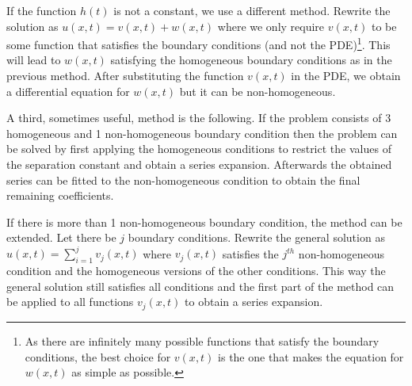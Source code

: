 
    \begin{method}
        If the function $h(t)$ is not a constant, we use a different method. Rewrite the solution as $u(x, t) = v(x, t) + w(x, t)$ where we only require $v(x, t)$ to be some function that satisfies the boundary conditions (and not the PDE)\footnote{As there are infinitely many possible functions that satisfy the boundary conditions, the best choice for $v(x, t)$ is the one that makes the equation for $w(x, t)$ as simple as possible.}. This will lead to $w(x, t)$ satisfying the homogeneous boundary conditions as in the previous method. After substituting the function $v(x, t)$ in the PDE, we obtain a differential equation for $w(x, t)$ but it can be non-homogeneous.
    \end{method}

    \begin{method}
        A third, sometimes useful, method is the following. If the problem consists of 3 homogeneous and 1 non-homogeneous boundary condition then the problem can be solved by first applying the homogeneous conditions to restrict the values of the separation constant and obtain a series expansion. Afterwards the obtained series can be fitted to the non-homogeneous condition to obtain the final remaining coefficients.

        If there is more than 1 non-homogeneous boundary condition, the method can be extended. Let there be $j$ boundary conditions. Rewrite the general solution as $u(x, t) = \sum_{i=1}^jv_j(x, t)$ where $v_j(x, t)$ satisfies the $j^{th}$ non-homogeneous condition and the homogeneous versions of the other conditions. This way the general solution still satisfies all conditions and the first part of the method can be applied to all functions $v_j(x, t)$ to obtain a series expansion.
    \end{method}

